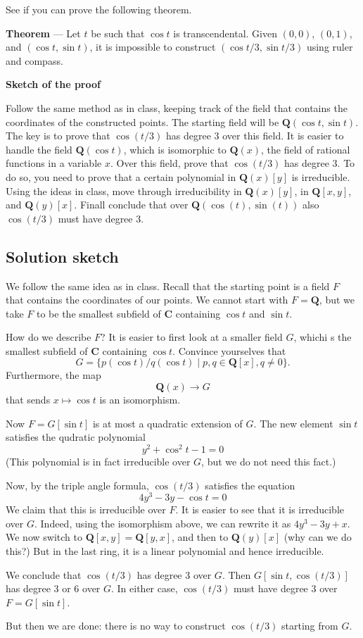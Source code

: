 \documentclass[12pt]{amsart}
\begin{document}
See if you can prove the following theorem.

\bigskip

\noindent
\textbf{\textbf{Theorem}} ---
Let \(t\) be such that \(\cos t\) is transcendental.
Given \((0,0)\), \((0,1)\), and \((\cos t, \sin t)\), it is impossible to construct \((\cos t/3, \sin t/3)\) using ruler and compass.

\bigskip

\noindent
\textbf{\textbf{Sketch of the proof}}

Follow the same method as in class, keeping track of the field that contains the coordinates of the constructed points.
The starting field will be \(\mathbf{Q}(\cos t, \sin t)\).
The key is to prove that \(\cos (t/3)\) has degree 3 over this field.
It is easier to handle the field \(\mathbf{Q}(\cos t)\), which is isomorphic to \(\mathbf{Q}(x)\), the field of rational functions in a variable \(x\).
Over this field, prove that \(\cos(t/3)\) has degree 3.
To do so, you need to prove that a certain polynomial in \(\mathbf{Q}(x)[y]\) is irreducible.
Using the ideas in class, move through irreducibility in \(\mathbf{Q}(x)[y]\), in \(\mathbf{Q}[x,y]\), and \(\mathbf{Q}(y)[x]\).
Finall conclude that over \(\mathbf{Q}(\cos(t), \sin(t))\) also \(\cos(t/3)\) must have degree 3.
\subsection*{Solution sketch}
\label{sec:org939486e}
We follow the same idea as in class.
Recall that the starting point is a field \(F\) that contains the coordinates of our points.
We cannot start with \(F = \mathbf{Q}\), but we take \(F\) to be the smallest subfield of \(\mathbf{C}\) containing \(\cos t\) and \(\sin t\).

How do we describe \(F\)?
It is easier to first look at a smaller field \(G\), whichi s the smallest subfield of \(\mathbf{C}\) containing \(\cos t\).
Convince yourselves that
\[ G = \{p(\cos t)/q(\cos t) \mid p, q \in \mathbf{Q}[x], q \neq 0\}.\]
Furthermore, the map
\[ \mathbf{Q}(x) \to G\]
that sends \(x \mapsto \cos t\) is an isomorphism.

Now \(F = G[\sin t]\) is at most a quadratic extension of \(G\).
The new element \(\sin t\) satisfies the qudratic polynomial
\[ y^2 + \cos^{2} t - 1 =  0\]
(This polynomial is in fact irreducible over \(G\), but we do not need this fact.)

Now, by the triple angle formula, \(\cos(t/3)\) satisfies the equation
\[ 4 y^3 - 3 y - \cos t = 0\]
We claim that this is irreducible over \(F\).
It is easier to see that it is irreducible over \(G\).
Indeed, using the isomorphism above, we can rewrite it as \(4y^3 - 3y + x\).
We now switch to \(\mathbf{Q}[x,y] = \mathbf{Q}[y,x]\), and then to \(\mathbf{Q}(y)[x]\) (why can we do this?)
But in the last ring, it is a linear polynomial and hence irreducible.

We conclude that \(\cos(t/3)\) has degree 3 over \(G\).
Then \(G[\sin t, \cos(t/3)]\) has degree 3 or 6 over \(G\).
In either case, \(\cos(t/3)\) must have degree 3 over \(F = G[\sin t]\).

But then we are done: there is no way to construct \(\cos (t/3)\) starting from \(G\).
\end{document}
